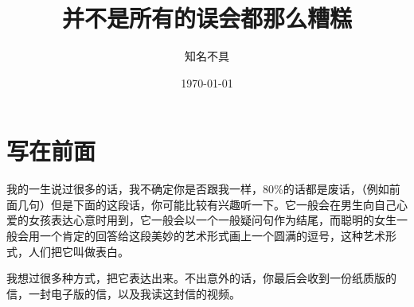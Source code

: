 \documentclass[cn,11pt,chinese]{elegantbook}
\title{并不是所有的误会都那么糟糕}
\author{知名不具}
\institute{中山大学}
\date{\today}
\begin{document}
\maketitle
\frontmatter

%
%
%
%
%
%


\tableofcontents

\mainmatter
\chapter{写在前面}

我的一生说过很多的话，我不确定你是否跟我一样，80\%的话都是废话，（例如前面几句）但是下面的这段话，你可能比较有兴趣听一下。它一般会在男生向自己心爱的女孩表达心意时用到，它一般会以一个一般疑问句作为结尾，而聪明的女生一般会用一个肯定的回答给这段美妙的艺术形式画上一个圆满的逗号，这种艺术形式，人们把它叫做表白。

我想过很多种方式，把它表达出来。不出意外的话，你最后会收到一份纸质版的信，一封电子版的信，以及我读这封信的视频。
\end{document}

